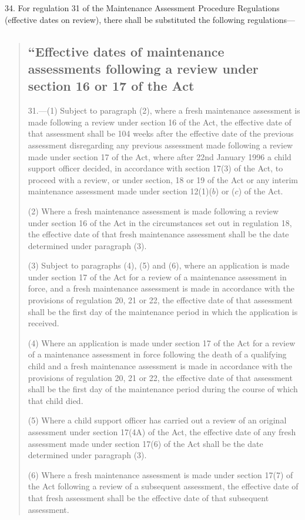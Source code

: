 \documentclass[a4paper]{article}
\begin{document}
34.  For regulation 31 of the Maintenance Assessment Procedure Regulations (effective dates on review), there shall be substituted the following regulations—
\begin{quotation}
\subsection*{“Effective dates of maintenance assessments following a review under section 16 or 17 of the Act}

31.—(1) Subject to paragraph (2), where a fresh maintenance assessment is made following a review under section 16 of the Act, the effective date of that assessment shall be 104 weeks after the effective date of the previous assessment disregarding any previous assessment made following a review made under section 17 of the Act, where after 22nd January 1996 a child support officer decided, in accordance with section 17(3) of the Act, to proceed with a review, or under section, 18 or 19 of the Act or any interim maintenance assessment made under section 12(1)($b$) or ($c$) of the Act.

(2) Where a fresh maintenance assessment is made following a review under section 16 of the Act in the circumstances set out in regulation 18, the effective date of that fresh maintenance assessment shall be the date determined under paragraph (3).

(3) Subject to paragraphs (4), (5) and (6), where an application is made under section 17 of the Act for a review of a maintenance assessment in force, and a fresh maintenance assessment is made in accordance with the provisions of regulation 20, 21 or 22, the effective date of that assessment shall be the first day of the maintenance period in which the application is received.

(4) Where an application is made under section 17 of the Act for a review of a maintenance assessment in force following the death of a qualifying child and a fresh maintenance assessment is made in accordance with the provisions of regulation 20, 21 or 22, the effective date of that assessment shall be the first day of the maintenance period during the course of which that child died.

(5) Where a child support officer has carried out a review of an original assessment under section 17(4A) of the Act, the effective date of any fresh assessment made under section 17(6) of the Act shall be the date determined under paragraph (3).

(6) Where a fresh maintenance assessment is made under section 17(7) of the Act following a review of a subsequent assessment, the effective date of that fresh assessment shall be the effective date of that subsequent assessment.


\end{quotation}
\end{document}
